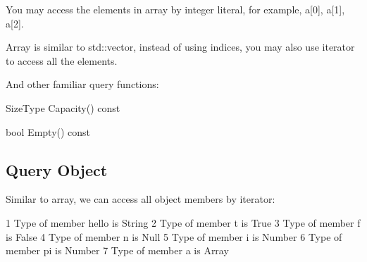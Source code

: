 You may access the elements in array by integer literal, for example, {\ttfamily a\mbox{[}0\mbox{]}}, {\ttfamily a\mbox{[}1\mbox{]}}, {\ttfamily a\mbox{[}2\mbox{]}}.

Array is similar to {\ttfamily std\+::vector}, instead of using indices, you may also use iterator to access all the elements. 


And other familiar query functions\+:
\begin{DoxyItemize}
\item {\ttfamily Size\+Type Capacity() const}
\item {\ttfamily bool Empty() const}
\end{DoxyItemize}\hypertarget{md_Commun_Externe_RapidJSON_doc_tutorial.zh-cn_QueryObject}{}\subsection{Query Object}\label{md_Commun_Externe_RapidJSON_doc_tutorial.zh-cn_QueryObject}
Similar to array, we can access all object members by iterator\+:





\begin{DoxyCode}
1 Type of member hello is String
2 Type of member t is True
3 Type of member f is False
4 Type of member n is Null
5 Type of member i is Number
6 Type of member pi is Number
7 Type of member a is Array
\end{DoxyCode}


